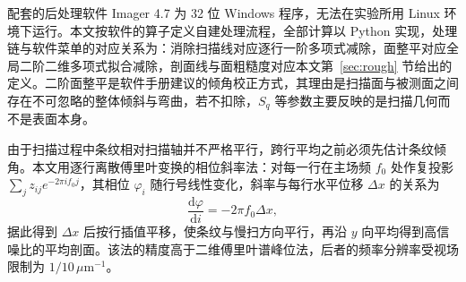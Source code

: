 \documentclass[12pt,a4paper,fontset=windows]{ctexart}
\begin{document}
配套的后处理软件 Imager 4.7 为 32 位 Windows 程序，无法在实验所用 Linux 环境下运行。本文按软件的算子定义自建处理流程，全部计算以 Python 实现，处理链与软件菜单的对应关系为：消除扫描线对应逐行一阶多项式减除，面整平对应全局二阶二维多项式拟合减除，剖面线与面粗糙度对应本文第~\ref{sec:rough} 节给出的定义。二阶面整平是软件手册建议的倾角校正方式，其理由是扫描面与被测面之间存在不可忽略的整体倾斜与弯曲，若不扣除，$S_q$ 等参数主要反映的是扫描几何而不是表面本身。

由于扫描过程中条纹相对扫描轴并不严格平行，跨行平均之前必须先估计条纹倾角。本文用逐行离散傅里叶变换的相位斜率法：对每一行在主场频 $f_0$ 处作复投影 $\sum_j z_{ij}e^{-2\pi i f_0 j}$，其相位 $\varphi_i$ 随行号线性变化，斜率与每行水平位移 $\Delta x$ 的关系为
\begin{equation}
\frac{\mathrm{d}\varphi}{\mathrm{d}i} = -2\pi f_0 \Delta x ,
\label{eq:tilt}
\end{equation}
据此得到 $\Delta x$ 后按行插值平移，使条纹与慢扫方向平行，再沿 $y$ 向平均得到高信噪比的平均剖面。该法的精度高于二维傅里叶谱峰位法，后者的频率分辨率受视场限制为 $1/10\,\mu\mathrm{m}^{-1}$。

\end{document}
